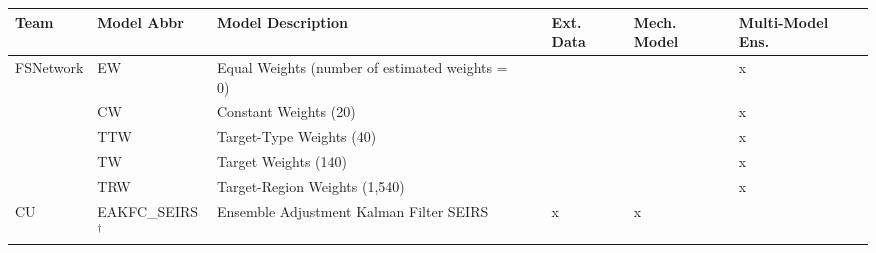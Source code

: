 \begin{table*}
\setlength{\tabcolsep}{4pt} 
\begin{tabular}{p{1.6cm} l p{7.5cm} l  p{1cm}  p{1cm} p{1cm}}
\hline
Team     & Model Abbr& Model Description & & Ext. Data & Mech. Model & Multi-Model Ens. \\ 
\hline

FSNetwork & EW       & Equal Weights (number of estimated weights = 0) & ~ & ~  & & x\\
 & CW       & Constant Weights (20) & & & & x  \\
 & TTW      & Target-Type Weights (40) & & & & x \\ 
 & TW       & Target Weights (140) & & & & x \\ 
 & TRW      & Target-Region Weights (1,540) & & & & x \\ 
\hline
CU       & EAKFC\_SEIRS$^\dagger$       & Ensemble Adjustment Kalman Filter SEIRS & \cite{Pei2017}  & x & x & \\ 


\end{tabular}
\end{table*}
